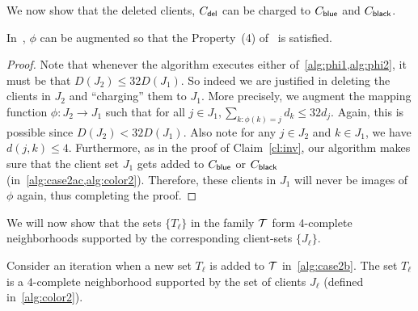 We now show that the deleted clients, $C_{\mathsf{del}}$ can be charged to $C_{\mathsf{blue}}$ and $C_{\mathsf{black}}$.
\begin{claim} \label{cl:phi-augment}
In~, $\phi$ can be augmented so that the Property~(4) of~ is satisfied.
\end{claim}
\begin{proof}
Note that whenever the algorithm executes either of~\cref{alg:phi1,alg:phi2}, it must be that $D(J_2) \leq 32 D(J_1)$. So indeed we are justified in deleting the clients in $J_2$ and ``charging'' them to $J_1$. More precisely, we augment the
mapping function $\phi:J_2 \to J_1$ such that for all $j\in J_1, \sum_{k:\phi(k) = j} d_k \leq 32d_j$. Again, this is possible since $D(J_2) < 32D(J_1)$. Also note for any $j\in J_2$ and $k\in J_1$,
we have $d(j,k) \leq 4$.
Furthermore, as in the proof of Claim~\ref{cl:inv}, our algorithm makes sure that the client set $J_1$ gets added to $C_{\mathsf{blue}}$ or $C_{\mathsf{black}}$ (in~\cref{alg:case2ac,alg:color2}).
Therefore, these clients in $J_1$ will never be images of $\phi$ again, thus completing the proof.
\end{proof}


We will now show that the sets $\{T_\ell\}$ in the family ${\cal T}$ form $4$-complete neighborhoods supported by the corresponding client-sets $\{J_\ell\}$.
\begin{lemma} \label{lem:local}
Consider an iteration when a new set $T_\ell$ is added to ${\cal T}$ in~\cref{alg:case2b}. The set $T_\ell$ is a $4$-complete neighborhood supported by the set of clients $J_\ell$ (defined in~\cref{alg:color2}).
\end{lemma}

